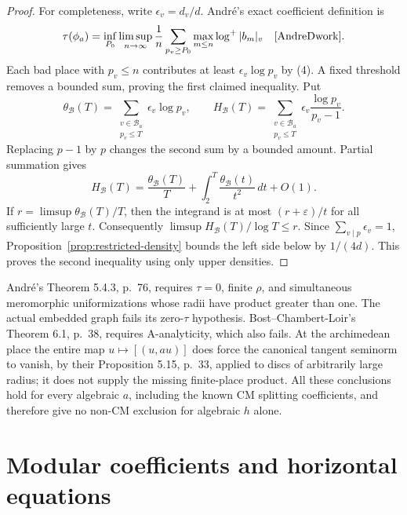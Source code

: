 \documentclass[11pt]{article}
\theoremstyle{definition}\newtheorem{definition}[theorem]{Definition}
\theoremstyle{remark}\newtheorem{remark}[theorem]{Remark}
\begin{document}
\begin{proof}
For completeness, write $\epsilon_v=d_v/d$. Andr\'e's exact coefficient definition is
\[
 \tau(\phi_a)=\inf_{P_0}\limsup_{n\to\infty}\frac1n
       \sum_{p_v\ge P_0}\max_{m\le n}\log^+|b_m|_v
 \quad\text{\cite[\S5.1, p.~70; \S5.3, p.~74]{AndreDwork}}.
\]
Each bad place with $p_v\le n$ contributes at least $\epsilon_v\log p_v$ by (4). A fixed threshold removes a bounded sum, proving the first claimed inequality. Put
\[
 \theta_{\mathcal B}(T)=\sum_{\substack{v\in\mathcal B_a\\p_v\le T}}
                         \epsilon_v\log p_v,
 \qquad H_{\mathcal B}(T)=\sum_{\substack{v\in\mathcal B_a\\p_v\le T}}
                         \epsilon_v\frac{\log p_v}{p_v-1}.
\]
Replacing $p-1$ by $p$ changes the second sum by a bounded amount. Partial summation gives
\[
 H_{\mathcal B}(T)=\frac{\theta_{\mathcal B}(T)}T
                +\int_2^T\frac{\theta_{\mathcal B}(t)}{t^2}\,dt+O(1).
\]
If $r=\limsup\theta_{\mathcal B}(T)/T$, then the integrand is at most $(r+\varepsilon)/t$ for all sufficiently large $t$. Consequently
$\limsup H_{\mathcal B}(T)/\log T\le r$. Since $\sum_{v\mid p}\epsilon_v=1$, Proposition~\ref{prop:restricted-density} bounds the left side below by $1/(4d)$. This proves the second inequality using only upper densities.
\end{proof}

Andr\'e's Theorem 5.4.3, p.~76, requires $\tau=0$, finite $\rho$, and simultaneous meromorphic uniformizations whose radii have product greater than one. The actual embedded graph fails its zero-$\tau$ hypothesis. Bost--Chambert-Loir's Theorem 6.1, p.~38, requires A-analyticity, which also fails. At the archimedean place the entire map $u\mapsto[(u,au)]$ does force the canonical tangent seminorm to vanish, by their Proposition 5.15, p.~33, applied to discs of arbitrarily large radius; it does not supply the missing finite-place product. All these conclusions hold for every algebraic $a$, including the known CM splitting coefficients, and therefore give no non-CM exclusion for algebraic $h$ alone.


\section{Modular coefficients and horizontal equations}\label{sec:elliptic-equations}
\end{document}
